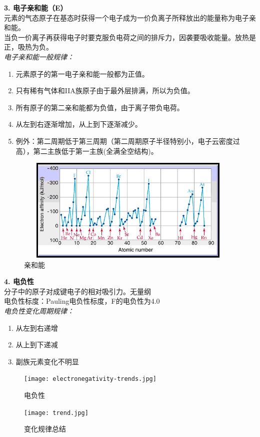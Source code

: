 \documentclass[utf8,a4paper,12pt]{ctexart}
\begin{document}
{\bf 3. 电子亲和能（E）}\\
元素的气态原子在基态时获得一个电子成为一价负离子所释放出的能量称为电子亲和能。\\
当负一价离子再获得电子时要克服负电荷之间的排斥力，因袭要吸收能量。放热是正，吸热为负。\\
\emph{电子亲和能一般规律：}
\begin{enumerate}[1)]
\item 元素原子的第一电子亲和能一般都为正值。
\item 只有稀有气体和IIA族原子由于最外层排满，所以为负值。
\item 所有原子的第二亲和能都为负值，由于离子带负电荷。
\item 从左到右逐渐增加，从上到下逐渐减少。
\item 例外：第二周期低于第三周期（第二周期原子半径特别小，电子云密度过高），第二主族低于第一主族(全满全空结构)。
\end{enumerate}
\begin{figure}[H]
\centering
\includegraphics[width=11cm,height=5cm]{electron-affinity.jpg}
\caption{亲和能}
\end{figure}
{\bf 4. 电负性}\\
分子中的原子对成键电子的相对吸引力。无量纲\\
电负性标度：Pauling电负性标度，F的电负性为4.0\\
\emph{电负性变化周期规律：}
\begin{enumerate}[1)]
\item 从左到右递增
\item 从上到下递减
\item 副族元素变化不明显
\end{enumerate}
\begin{figure}[H]
\centering
\texttt{[image: electronegativity-trends.jpg]}
\caption{电负性}
\end{figure}
\begin{figure}[H]
\centering
\texttt{[image: trend.jpg]}
\caption{变化规律总结}
\end{figure}
\end{document}
